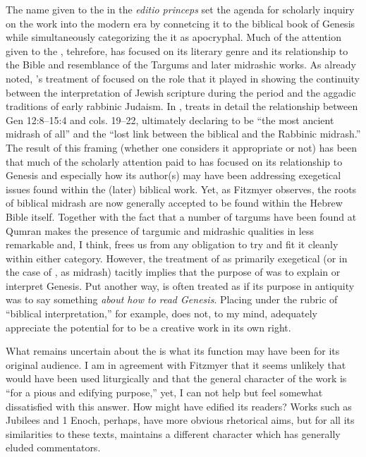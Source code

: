 The name given to the \ga in the \emph{editio princeps} set the agenda for scholarly inquiry on the work into the modern era by connetcing it to the biblical book of Genesis while simultaneously categorizing the it as apocryphal. Much of the attention given to the \ga, tehrefore, has focused on its literary genre and its relationship to the Bible and resemblance of the Targums and later midrashic works. As already noted, \vermes's treatment of \ga focused on the role that it played in showing the continuity between the interpretation of Jewish scripture during the \secondtemple period and the aggadic traditions of early rabbinic Judaism. In \cite*{vermes1961}, \vermes treats in detail the relationship between Gen 12:8--15:4 and \ga cols. 19--22, ultimately declaring \ga to be ``the most ancient midrash of all'' and the ``lost link between the biblical and the Rabbinic midrash.''\autocite[124]{vermes1961} The result of this framing (whether one considers it appropriate or not) has been that much of the scholarly attention paid to \ga has focused on its relationship to Genesis and especially how its author(s) may have been addressing exegetical issues found within the (later) biblical work. Yet, as Fitzmyer observes, the roots of biblical midrash are now generally accepted to be found within the Hebrew Bible itself. Together with the fact that a number of targums have been found at Qumran makes the presence of targumic and midrashic qualities in \ga less remarkable and, I think, frees us from any obligation to try and fit it cleanly within either category.\autocite[20]{fitzmyer2004} However, the treatment of \ga as primarily exegetical (or in the case of \vermes, as midrash) tacitly implies that the purpose of \ga was to explain or interpret Genesis. Put another way, \ga is often treated as if its purpose in antiquity was to say something \emph{about how to read Genesis}. Placing \ga under the rubric of ``biblical interpretation,'' for example, does not, to my mind, adequately appreciate the potential for \ga to be a creative work in its own right.

What remains uncertain about the \ga is what its function may have been for its original audience. I am in agreement with Fitzmyer that it seems unlikely that \ga would have been used liturgically and that the general character of the work is ``for a pious and edifying purpose,''\autocite[20]{fitzmyer2004} yet, I can not help but feel somewhat dissatisfied with this answer. How might \ga have edified its readers? Works such as Jubilees and 1 Enoch, perhaps, have more obvious rhetorical aims, but for all its similarities to these texts, \ga maintains a different character which has generally eluded commentators.

